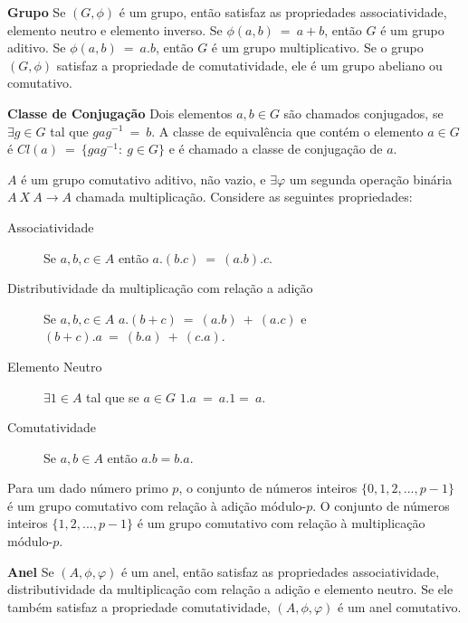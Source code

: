 \begin{definition} {\bf Grupo} \label{grupo}  Se $(G, \phi)$ é um grupo, então satisfaz as propriedades associatividade, elemento neutro e elemento inverso. Se $\phi(a,b)\ =\ a+b$, então $G$ é um grupo aditivo. Se $\phi(a,b)\ =\ a.b$, então $G$ é um grupo multiplicativo. Se o grupo $(G, \phi)$ satisfaz a propriedade de comutatividade, ele é um grupo abeliano ou comutativo.
\end{definition}

\begin{definition} {\bf Classe de Conjugação} \label{clconj}  Dois elementos $a, b \in G$ são chamados conjugados, se $\exists g \in G$ tal que $gag^{-1}\ =\ b$. A classe de equivalência que contém o elemento $a \in G$ é $Cl(a)\ =\ \{gag^{-1}:\ g \in G \}$ e é chamado a classe de conjugação de $a$.
\end{definition}

\begin{definition} $A$ é um grupo comutativo aditivo, não vazio, e $\exists \varphi$ um segunda operação binária $A\ X\ A \rightarrow A$ chamada multiplicação. Considere as seguintes propriedades:
  \begin{description}
     \item [Associatividade] Se $a, b, c \in A$ então $a.(b.c)\ =\ (a.b).c$.
     \item [Distributividade da multiplicação com relação a adição] Se $a, b, c \in A$ $a.(b+c)\ =\ (a.b)\ +\ (a.c)$ e $(b+c).a\ =\ (b.a)\ +\ (c.a)$.
     \item [Elemento Neutro] $\exists 1 \in A$ tal que se $a \in G$ $1.a\ =\ a.1 =\ a$.
     \item [Comutatividade] Se $a, b \in A$ então $a . b = b . a$.
  \end{description}
\end{definition}

\begin{example}
Para um dado número primo $p$, o conjunto de números inteiros $\{0, 1, 2, . . . , p - 1\}$ é um grupo comutativo com relação à adição módulo-$p$. O conjunto de números inteiros $\{1, 2, . . . , p - 1\}$ é um grupo comutativo com relação à multiplicação módulo-$p$.
\end{example}

\begin{definition} {\bf Anel} \label{anel}  Se $(A, \phi, \varphi)$ é um anel, então satisfaz as propriedades associatividade, distributividade da multiplicação com relação a adição e elemento neutro. Se ele também satisfaz a propriedade comutatividade, $(A, \phi, \varphi)$ é um anel comutativo.
\end{definition}

